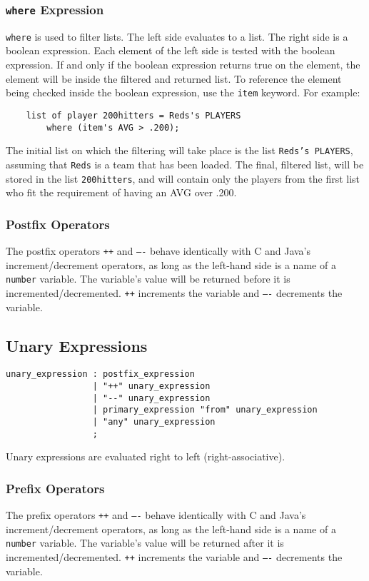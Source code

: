 \subsubsection{\texttt{where} Expression}\label{ref_expr_where}
\texttt{where} is used to filter lists. The left side evaluates to a
list. The right side is a boolean expression. Each element of the left
side is tested with the boolean expression. If and only if the boolean
expression returns true on the element, the element will be inside the
filtered and returned list. To reference the element being checked
inside the boolean expression, use the \texttt{item} keyword. For
example:

\begin{verbatim}
    list of player 200hitters = Reds's PLAYERS 
        where (item's AVG > .200);
\end{verbatim}

The initial list on which the filtering will take place is the list
\texttt{Reds's PLAYERS}, assuming that \texttt{Reds} is a team that
has been loaded. The final, filtered list, will be stored in the list
\texttt{200hitters}, and will contain only the players from the first
list who fit the requirement of having an AVG over .200.

\subsubsection{Postfix Operators}
The postfix operators \texttt{++} and \texttt{----} behave identically with C and Java's increment/decrement operators, as long as the left-hand side is a name of a \texttt{number} variable. The variable's value will be returned before it is incremented/decremented. \texttt{++} increments the variable and \texttt{----} decrements the variable.

\subsection{Unary Expressions}
\begin{verbatim}
unary_expression : postfix_expression
                 | "++" unary_expression
                 | "--" unary_expression
                 | primary_expression "from" unary_expression
                 | "any" unary_expression
                 ;
\end{verbatim}
Unary expressions are evaluated right to left (right-associative).

\subsubsection{Prefix Operators}
The prefix operators \texttt{++} and \texttt{----} behave identically with C and Java's increment/decrement operators, as long as the left-hand side is a name of a \texttt{number} variable. The variable's value will be returned after it is incremented/decremented. \texttt{++} increments the variable and \texttt{----} decrements the variable.

